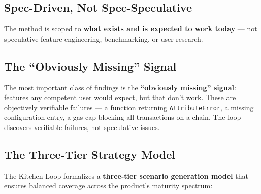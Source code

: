 \documentclass[11pt,a4paper]{article}
\begin{document}
\subsection{Spec-Driven, Not Spec-Speculative}\label{sec:spec-driven-not-spec-speculative}

The method is scoped to \textbf{what exists and is expected to work today} --- not speculative feature engineering, benchmarking, or user research.

\subsection{The ``Obviously Missing'' Signal}\label{sec:obviously-missing-signal}

The most important class of findings is the \textbf{``obviously missing'' signal}: features any competent user would expect, but that don't work. These are objectively verifiable failures --- a function returning \texttt{AttributeError}, a missing configuration entry, a gas cap blocking all transactions on a chain. The loop discovers verifiable failures, not speculative issues.

\subsection{The Three-Tier Strategy Model}\label{sec:three-tier-strategy-model}

The Kitchen Loop formalizes a \textbf{three-tier scenario generation model} that ensures balanced coverage across the product's maturity spectrum:

\begin{figure}[h]
\centering
{}
\end{figure}
\end{document}
